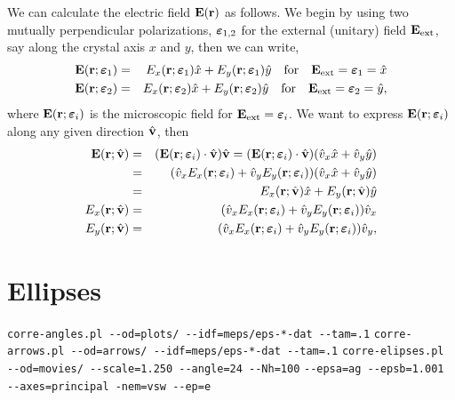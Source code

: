 \documentclass[preprint,12pt]{revtex4}
\begin{document}
We can calculate the electric field $\mathbf{E}(\mathbf{r})$ as follows. We begin
by using two mutually perpendicular polarizations, $\boldsymbol{\varepsilon}_{1,2}$ for the external
(unitary) field $\mathbf{E}_\mathrm{ext}$, say along the crystal axis $x$ and $y$,
then we can write,
\begin{eqnarray}\label{ee.1}
\mathbf{E}(\mathbf{r};\boldsymbol{\varepsilon}_1)
&=&
E_x(\mathbf{r};\boldsymbol{\varepsilon}_1)\hat x
+
E_y(\mathbf{r};\boldsymbol{\varepsilon}_1)\hat y
\quad \mathrm{for}\quad\mathbf{E}_\mathrm{ext}=\boldsymbol{\varepsilon}_1=\hat x 
\nonumber\\
\mathbf{E}(\mathbf{r};\boldsymbol{\varepsilon}_2)
&=&
E_x(\mathbf{r};\boldsymbol{\varepsilon}_2)\hat x
+
E_y(\mathbf{r};\boldsymbol{\varepsilon}_2)\hat y
\quad \mathrm{for}\quad\mathbf{E}_\mathrm{ext}=\boldsymbol{\varepsilon}_2=\hat y 
,
\end{eqnarray}
where $\mathbf{E}(\mathbf{r};\boldsymbol{\varepsilon}_{i})$ is the microscopic field for
$\mathbf{E}_\mathrm{ext}=\boldsymbol{\varepsilon}_i$. 
We want to express $\mathbf{E}(\mathbf{r};\boldsymbol{\varepsilon}_{i})$ along any given direction
$\hat{\mathbf{v}}$, then
\begin{eqnarray}\label{ee.2}
\mathbf{E}(\mathbf{r};\hat{\mathbf{v}})
&=&
(\mathbf{E}(\mathbf{r};\boldsymbol{\varepsilon}_{i})\cdot\hat{\mathbf{v}})\hat{\mathbf{v}}
=
(\mathbf{E}(\mathbf{r};\boldsymbol{\varepsilon}_{i})\cdot\hat{\mathbf{v}})(\hat v_x\hat x+\hat v_y\hat y)
\nonumber\\
&=&
 (\hat v_xE_x(\mathbf{r};\boldsymbol{\varepsilon}_{i})
+
\hat v_yE_y(\mathbf{r};\boldsymbol{\varepsilon}_{i}))
 (\hat v_x\hat x+\hat v_y\hat y)
\nonumber\\
&=&
E_x(\mathbf{r};\hat{\mathbf{v}})\hat x
+
E_y(\mathbf{r};\hat{\mathbf{v}})\hat y
\nonumber\\
E_x(\mathbf{r};\hat{\mathbf{v}})&=&
 (\hat v_xE_x(\mathbf{r};\boldsymbol{\varepsilon}_{i})
+
\hat v_yE_y(\mathbf{r};\boldsymbol{\varepsilon}_{i}))\hat v_x
\nonumber\\
E_y(\mathbf{r};\hat{\mathbf{v}})&=&
 (\hat v_xE_x(\mathbf{r};\boldsymbol{\varepsilon}_{i})
+
\hat v_yE_y(\mathbf{r};\boldsymbol{\varepsilon}_{i}))\hat v_y
,
\end{eqnarray} 
\section{Ellipses}

\Verb+corre-angles.pl --od=plots/ --idf=meps/eps-*-dat --tam=.1+
\Verb+corre-arrows.pl --od=arrows/ --idf=meps/eps-*-dat --tam=.1+
\Verb+corre-elipses.pl --od=movies/ --scale=1.250 --angle=24 --Nh=100+
\Verb+--epsa=ag --epsb=1.001 --axes=principal -nem=vsw --ep=e+


\end{document}
